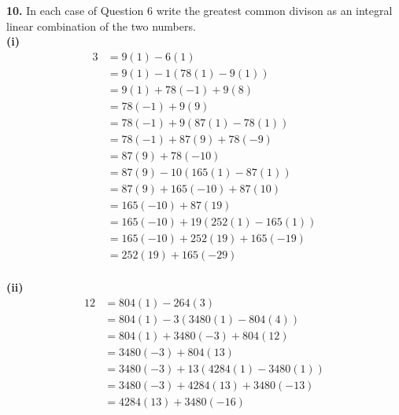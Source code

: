 \documentclass[paper=letter, fontsize=11pt]{scrartcl} %
\begin{document}
\textbf{10.} In each case of Question 6 write the greatest common divison as an integral 
linear combination of the two numbers. \\

\textbf{(i)}
\begin{align*}
    3 &= 9(1) - 6(1) \\
    &= 9(1) - 1(78(1) - 9(1)) \\
    &= 9(1) + 78(-1) + 9(8) \\
    &= 78(-1) + 9(9) \\
    &= 78(-1) + 9(87(1)-78(1)) \\
    &= 78(-1) + 87(9) + 78(-9) \\
    &= 87(9) + 78(-10) \\
    &= 87(9) - 10(165(1) - 87(1)) \\
    &= 87(9) + 165(-10) + 87(10) \\
    &= 165(-10) + 87(19) \\
    &= 165(-10) + 19(252(1) - 165(1)) \\
    &= 165(-10) + 252(19) + 165(-19) \\
    &= 252(19) + 165(-29) \\
\end{align*}

\textbf{(ii)}
\begin{align*}
    12 &= 804(1) - 264(3) \\
    &= 804(1) - 3(3480(1) - 804(4)) \\
    &= 804(1) + 3480(-3) + 804(12) \\
    &= 3480(-3) + 804(13) \\
    &= 3480(-3) + 13(4284(1) - 3480(1)) \\
    &= 3480(-3) + 4284(13) + 3480(-13) \\
    &= 4284(13) + 3480(-16)
\end{align*}
\end{document}
